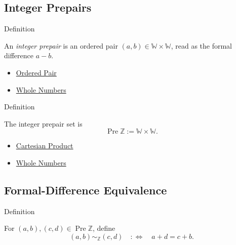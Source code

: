 \subsection*{Integer Prepairs}

\begin{definitionbox}{Definition}
\begin{definition}
\label{def:integer-prepair}
An \emph{integer prepair} is an ordered pair $(a,b)\in\mathbb{W}\times\mathbb{W}$,
read as the formal difference $a-b$.
\end{definition}
\end{definitionbox}

\begin{dependencies}
\begin{itemize}
  \item \hyperref[def:ordered-pair]{Ordered Pair}
  \item \hyperref[def:whole-numbers]{Whole Numbers}
\end{itemize}
\end{dependencies}

\begin{definitionbox}{Definition}
\begin{definition}
\label{def:integer-prepair-set}
The integer prepair set is
\[
\operatorname{Pre}\mathbb{Z}:=\mathbb{W}\times\mathbb{W}.
\]
\end{definition}
\end{definitionbox}

\begin{dependencies}
\begin{itemize}
  \item \hyperref[def:cartesian-product-rel]{Cartesian Product}
  \item \hyperref[def:whole-numbers]{Whole Numbers}
\end{itemize}
\end{dependencies}

\subsection*{Formal-Difference Equivalence}

\begin{definitionbox}{Definition}
\begin{definition}
\label{def:formal-difference-equivalence}
For $(a,b),(c,d)\in\operatorname{Pre}\mathbb{Z}$, define
\[
(a,b)\sim_{\mathbb{Z}}(c,d)
\quad:\Longleftrightarrow\quad
a+d=c+b.
\]
\end{definition}
\end{definitionbox}

